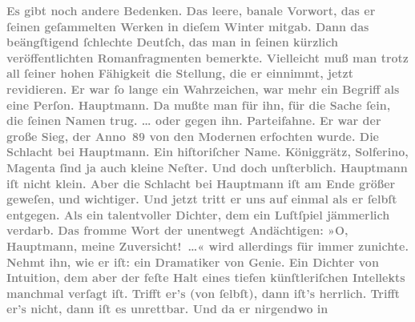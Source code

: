 \begin{ledgroupsized}[t]{13cm}
           \pstart
           \noindent{}\textcolor{gray}{\textbf{Es gibt noch andere Bedenken. Das leere, banale Vorwort, das er
                  ſeinen geſammelten Werken in dieſem Winter mitgab. Dann das beängſtigend ſchlechte
                  Deutſch, das man in ſeinen kürzlich veröffentlichten Romanfragmenten bemerkte.
                  Vielleicht muß man trotz all ſeiner hohen Fähigkeit die Stellung, die er einnimmt,
                  jetzt revidieren. Er war ſo lange ein Wahrzeichen, war mehr ein Begriff als eine
                  Perſon. Hauptmann. Da mußte man für ihn,
                  für die Sache ſein, die ſeinen Namen trug. \textsc{\label{K_L03438-881v}\label{K_L03438-881h}}{\dots} oder gegen ihn. Parteifahne. Er war der große Sieg,
                  der Anno 89 von den Modernen erfochten wurde. Die Schlacht bei Hauptmann. Ein hiſtoriſcher Name. Königgrätz, Solferino,
                     Magenta ſind ja auch kleine Neſter. Und
                  doch unſterblich. Hauptmann iſt nicht
                  klein. Aber die Schlacht bei Hauptmann iſt
                  am Ende größer geweſen, und wichtiger. Und jetzt tritt er uns auf einmal als er
                  ſelbſt entgegen. Als ein talentvoller Dichter, dem ein Luſtſpiel jämmerlich
                  verdarb. Das fromme Wort der unentwegt Andächtigen: »O, Hauptmann, meine Zuversicht! {\dots}«
                  wird allerdings für immer zunichte. Nehmt ihn, wie er iſt: ein Dramatiker von
                  Genie. Ein Dichter von Intuition, dem aber der feſte Halt eines tiefen
                  künſtleriſchen Intellekts manchmal verſagt iſt. Trifft er’s (von ſelbſt), dann
                  iſt’s herrlich. Trifft er’s nicht, dann iſt es unrettbar. Und da er nirgendwo in
}}
\end{ledgroupsized}
